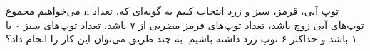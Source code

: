 \p
	می‌خواهیم مجموع n توپ آبی، قرمز، سبز و زرد انتخاب کنیم به گونه‌ای که، تعداد توپ‌های آبی زوج باشد، تعداد توپ‌‌های قرمز مضربی از ۷ باشد، تعداد توپ‌های سبز ۰ یا ۱ باشد و حداکثر ۶ توپ زرد داشته باشیم. به چند طریق می‌توان این کار را انجام داد؟